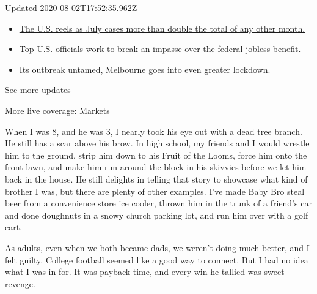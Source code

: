 Updated 2020-08-02T17:52:35.962Z

\begin{itemize}
\tightlist
\item
  \href{https://www.nytimes3xbfgragh.onion/2020/08/01/world/coronavirus-covid-19.html?action=click\&pgtype=Article\&state=default\&region=MAIN_CONTENT_1\&context=storylines_live_updates\#link-34047410}{The
  U.S. reels as July cases more than double the total of any other
  month.}
\item
  \href{https://www.nytimes3xbfgragh.onion/2020/08/01/world/coronavirus-covid-19.html?action=click\&pgtype=Article\&state=default\&region=MAIN_CONTENT_1\&context=storylines_live_updates\#link-780ec966}{Top
  U.S. officials work to break an impasse over the federal jobless
  benefit.}
\item
  \href{https://www.nytimes3xbfgragh.onion/2020/08/01/world/coronavirus-covid-19.html?action=click\&pgtype=Article\&state=default\&region=MAIN_CONTENT_1\&context=storylines_live_updates\#link-2bc8948}{Its
  outbreak untamed, Melbourne goes into even greater lockdown.}
\end{itemize}

\href{https://www.nytimes3xbfgragh.onion/2020/08/01/world/coronavirus-covid-19.html?action=click\&pgtype=Article\&state=default\&region=MAIN_CONTENT_1\&context=storylines_live_updates}{See
more updates}

More live coverage:
\href{https://www.nytimes3xbfgragh.onion/live/2020/07/31/business/stock-market-today-coronavirus?action=click\&pgtype=Article\&state=default\&region=MAIN_CONTENT_1\&context=storylines_live_updates}{Markets}

When I was 8, and he was 3, I nearly took his eye out with a dead tree
branch. He still has a scar above his brow. In high school, my friends
and I would wrestle him to the ground, strip him down to his Fruit of
the Looms, force him onto the front lawn, and make him run around the
block in his skivvies before we let him back in the house. He still
delights in telling that story to showcase what kind of brother I was,
but there are plenty of other examples. I've made Baby Bro steal beer
from a convenience store ice cooler, thrown him in the trunk of a
friend's car and done doughnuts in a snowy church parking lot, and run
him over with a golf cart.

As adults, even when we both became dads, we weren't doing much better,
and I felt guilty. College football seemed like a good way to connect.
But I had no idea what I was in for. It was payback time, and every win
he tallied was sweet revenge.


